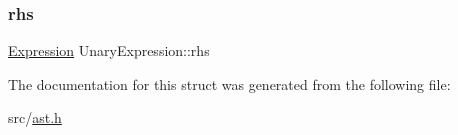 \mbox{\label{struct_unary_expression_ae574f5f744a28eb02d260a40127b74dc}} 
\subsubsection{\texorpdfstring{rhs}{rhs}}
{\footnotesize\ttfamily \hyperlink{ast_8h_a4cb273a4d960cd13ea17d08f254493e8}{Expression} Unary\+Expression\+::rhs}



The documentation for this struct was generated from the following file\+:\begin{DoxyCompactItemize}
\item 
src/\hyperlink{ast_8h}{ast.\+h}\end{DoxyCompactItemize}
